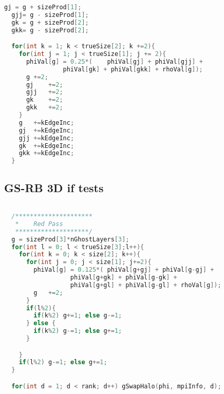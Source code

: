 \begin{lstlisting}[language=c, caption = Loop through grid]
  gj = g + sizeProd[1];
  gjj= g - sizeProd[1];
  gk = g + sizeProd[2];
  gkk= g - sizeProd[2];

  for(int k = 1; k < trueSize[2]; k +=2){
    for(int j = 1; j < trueSize[1]; j += 2){
      phiVal[g] = 0.25*(	phiVal[gj] + phiVal[gjj] +
                phiVal[gk] + phiVal[gkk] + rhoVal[g]);
      g	+=2;
      gj	+=2;
      gjj	+=2;
      gk	+=2;
      gkk	+=2;
    }
    g	+=kEdgeInc;
    gj	+=kEdgeInc;
    gjj	+=kEdgeInc;
    gk	+=kEdgeInc;
    gkk	+=kEdgeInc;
  }
\end{lstlisting}

\newpage
\subsection{GS-RB 3D if tests}
\label{sec:GS-RB_if}
\begin{lstlisting}[language=c, caption = GS-RB with if-tests]

  /*********************
   *	Red Pass
   ********************/
  g = sizeProd[3]*nGhostLayers[3];
  for(int l = 0; l < trueSize[3];l++){
    for(int k = 0; k < size[2]; k++){
      for(int j = 0; j < size[1]; j+=2){
        phiVal[g] = 0.125*(	phiVal[g+gj] + phiVal[g-gj] +
                  phiVal[g+gk] + phiVal[g-gk] +
                  phiVal[g+gl] + phiVal[g-gl] + rhoVal[g]);
        g	+=2;
      }
      if(l%2){
        if(k%2)	g+=1; else g-=1;
      } else {
        if(k%2) g-=1; else g+=1;
      }

    }
    if(l%2) g-=1; else g+=1;
  }

  for(int d = 1; d < rank; d++) gSwapHalo(phi, mpiInfo, d);
\end{lstlisting}

\newpage
